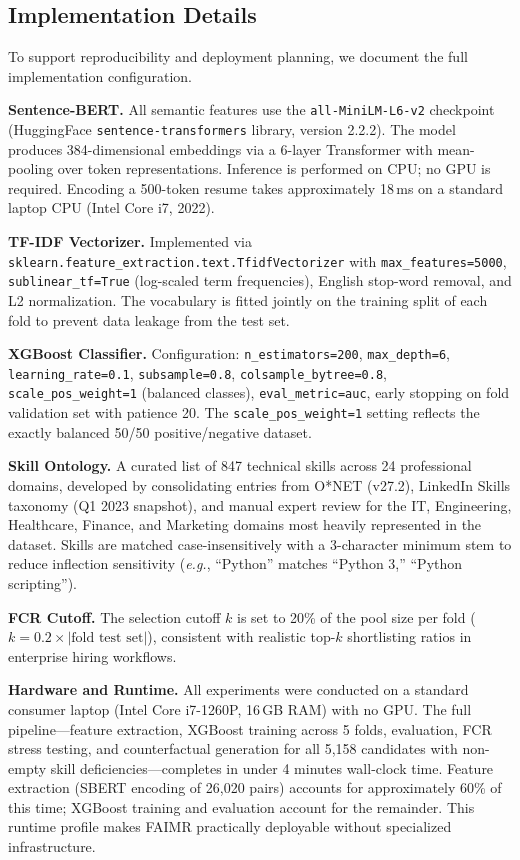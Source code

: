 \documentclass[smallcondensed,numbers]{sn-jnl}
\begin{document}
\subsection{Implementation Details}
\label{sec:impl}

To support reproducibility and deployment planning, we document the full implementation configuration.

\textbf{Sentence-BERT.} All semantic features use the \texttt{all-MiniLM-L6-v2} checkpoint (HuggingFace \texttt{sentence-transformers} library, version 2.2.2). The model produces 384-dimensional embeddings via a 6-layer Transformer with mean-pooling over token representations. Inference is performed on CPU; no GPU is required. Encoding a 500-token resume takes approximately 18\,ms on a standard laptop CPU (Intel Core i7, 2022).

\textbf{TF-IDF Vectorizer.} Implemented via \texttt{sklearn.feature\_extraction.text.TfidfVectorizer} with \texttt{max\_features=5000}, \texttt{sublinear\_tf=True} (log-scaled term frequencies), English stop-word removal, and L2 normalization. The vocabulary is fitted jointly on the training split of each fold to prevent data leakage from the test set.

\textbf{XGBoost Classifier.} Configuration: \texttt{n\_estimators=200}, \texttt{max\_depth=6}, \texttt{learning\_rate=0.1}, \texttt{subsample=0.8}, \texttt{colsample\_bytree=0.8}, \texttt{scale\_pos\_weight=1} (balanced classes), \texttt{eval\_metric=auc}, early stopping on fold validation set with patience 20. The \texttt{scale\_pos\_weight=1} setting reflects the exactly balanced 50/50 positive/negative dataset.

\textbf{Skill Ontology.} A curated list of 847 technical skills across 24 professional domains, developed by consolidating entries from O*NET (v27.2), LinkedIn Skills taxonomy (Q1 2023 snapshot), and manual expert review for the IT, Engineering, Healthcare, Finance, and Marketing domains most heavily represented in the dataset. Skills are matched case-insensitively with a 3-character minimum stem to reduce inflection sensitivity (\textit{e.g.}, ``Python'' matches ``Python 3,'' ``Python scripting'').

\textbf{FCR Cutoff.} The selection cutoff $k$ is set to 20\% of the pool size per fold ($k = 0.2 \times |\text{fold test set}|$), consistent with realistic top-$k$ shortlisting ratios in enterprise hiring workflows.

\textbf{Hardware and Runtime.} All experiments were conducted on a standard consumer laptop (Intel Core i7-1260P, 16\,GB RAM) with no GPU. The full pipeline---feature extraction, XGBoost training across 5 folds, evaluation, FCR stress testing, and counterfactual generation for all 5,158 candidates with non-empty skill deficiencies---completes in under 4 minutes wall-clock time. Feature extraction (SBERT encoding of 26,020 pairs) accounts for approximately 60\% of this time; XGBoost training and evaluation account for the remainder. This runtime profile makes FAIMR practically deployable without specialized infrastructure.
\end{document}
